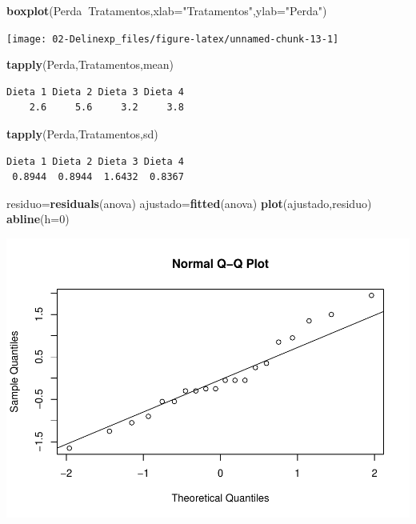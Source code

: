 \documentclass[12pt,brazil,oneside]{book}
\newenvironment{Shaded}{\begin{snugshade}}{\end{snugshade}}
\newcommand{\DataTypeTok}[1]{\textcolor[rgb]{0.13,0.29,0.53}{#1}}
\newcommand{\DecValTok}[1]{\textcolor[rgb]{0.00,0.00,0.81}{#1}}
\newcommand{\KeywordTok}[1]{\textcolor[rgb]{0.13,0.29,0.53}{\textbf{#1}}}
\newcommand{\NormalTok}[1]{#1}
\newcommand{\OperatorTok}[1]{\textcolor[rgb]{0.81,0.36,0.00}{\textbf{#1}}}
\newcommand{\StringTok}[1]{\textcolor[rgb]{0.31,0.60,0.02}{#1}}
\begin{document}
\begin{Shaded}
\begin{Highlighting}[]
\KeywordTok{boxplot}\NormalTok{(Perda}\OperatorTok{~}\NormalTok{Tratamentos,}\DataTypeTok{xlab=}\StringTok{"Tratamentos"}\NormalTok{,}\DataTypeTok{ylab=}\StringTok{"Perda"}\NormalTok{)}
\end{Highlighting}
\end{Shaded}

\begin{center}\texttt{[image: 02-Delinexp\_files/figure-latex/unnamed-chunk-13-1]} \end{center}

\begin{Shaded}
\begin{Highlighting}[]
\KeywordTok{tapply}\NormalTok{(Perda,Tratamentos,mean)}
\end{Highlighting}
\end{Shaded}

\begin{verbatim}
Dieta 1 Dieta 2 Dieta 3 Dieta 4 
    2.6     5.6     3.2     3.8 
\end{verbatim}

\begin{Shaded}
\begin{Highlighting}[]
\KeywordTok{tapply}\NormalTok{(Perda,Tratamentos,sd)}
\end{Highlighting}
\end{Shaded}

\begin{verbatim}
Dieta 1 Dieta 2 Dieta 3 Dieta 4 
 0.8944  0.8944  1.6432  0.8367 
\end{verbatim}

\begin{Shaded}
\begin{Highlighting}[]
\NormalTok{residuo=}\KeywordTok{residuals}\NormalTok{(anova)}
\NormalTok{ajustado=}\KeywordTok{fitted}\NormalTok{(anova)}
\KeywordTok{plot}\NormalTok{(ajustado,residuo)}
\KeywordTok{abline}\NormalTok{(}\DataTypeTok{h=}\DecValTok{0}\NormalTok{)}
\end{Highlighting}
\end{Shaded}

\begin{center}\includegraphics[width=0.6\linewidth]{02-Delinexp_files/figure-latex/unnamed-chunk-15-1} \end{center}
\end{document}
